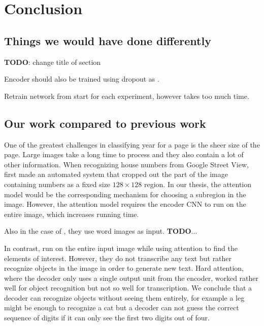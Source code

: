 \chapter{Conclusion}

\section{Things we would have done differently}
\textbf{TODO}: change title of section

Encoder should also be trained using dropout as \textcite{multidigit_streetview}.

Retrain network from start for each experiment, however takes too much time.


\section{Our work compared to previous work}


One of the greatest challenges in classifying year for a page is the sheer size of the page. Large images take a long time to process and they also contain a lot of other information. When recognizing house numbers from Google Street View, \textcite{multidigit_streetview} first made an automated system that cropped out the part of the image containing numbers as a fixed size $128 \times 128$ region. In our thesis, the attention model would be the corresponding mechanism for choosing a subregion in the image. However, the attention model requires the encoder CNN to run on the entire image, which increases running time.

Also in the case of \cite{FornesCnnCategorization}, they use word images as input.
\textbf{TODO}...

In contrast, \textcite{AttendAndTell} run on the entire input image while using attention to find the elements of interest. However, they do not transcribe any text but rather recognize objects in the image in order to generate new text. Hard attention, where the decoder only uses a single output unit from the encoder, worked rather well for object recognition but not so well for transcription. We conclude that a decoder can recognize objects without seeing them entirely, for example a leg might be enough to recognize a cat but a decoder can not guess the correct sequence of digits if it can only see the first two digits out of four.

